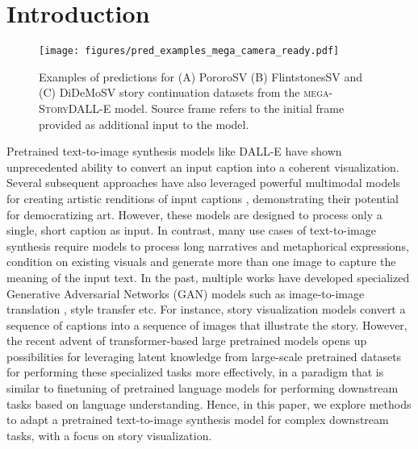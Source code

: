 \documentclass[runningheads]{llncs}
\newcommand{\sdallem}[1]{\textsc{mega-StoryDALL-E}}
\begin{document}
\section{Introduction}
\label{sec:intro}

\begin{figure*}[t]
    \centering
    \texttt{[image: figures/pred\_examples\_mega\_camera\_ready.pdf]}
    \caption{Examples of predictions for (A) PororoSV (B) FlintstonesSV and (C) DiDeMoSV story continuation datasets from the \sdallem{} model. Source frame refers to the initial frame provided as additional input to the model.}
    \label{fig:predictions_mega}
\end{figure*}

Pretrained text-to-image synthesis models like DALL-E \cite{ramesh2021zero} have shown unprecedented ability to convert an input caption into a coherent visualization. Several subsequent approaches have also leveraged powerful multimodal models \cite{radford2021learning, esser2021taming} for creating artistic renditions of input captions \cite{frans2021clipdraw}, demonstrating their potential for democratizing art. However, these models are designed to process only a single, short caption as input. In contrast, many use cases of text-to-image synthesis require models to process long narratives and metaphorical expressions, condition on existing visuals and generate more than one image to capture the meaning of the input text. In the past, multiple works have developed specialized Generative Adversarial Networks (GAN) models such as image-to-image translation \cite{isola2017image}, style transfer \cite{karras2019style} etc. For instance, story visualization models \cite{li2019storygan} convert a sequence of captions into a sequence of images that illustrate the story. However, the recent advent of transformer-based large pretrained models opens up possibilities for leveraging latent knowledge from large-scale pretrained datasets for performing these specialized tasks more effectively, in a paradigm that is similar to finetuning of pretrained language models for performing downstream tasks based on language understanding.
Hence, in this paper, we explore methods to adapt a pretrained text-to-image synthesis model for complex downstream tasks, with a focus on story visualization.
\end{document}
